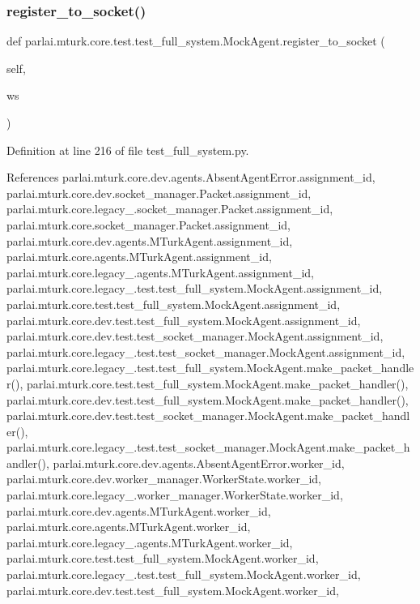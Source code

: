 \subsubsection{\texorpdfstring{register\+\_\+to\+\_\+socket()}{register\_to\_socket()}}
{\footnotesize\ttfamily def parlai.\+mturk.\+core.\+test.\+test\+\_\+full\+\_\+system.\+Mock\+Agent.\+register\+\_\+to\+\_\+socket (\begin{DoxyParamCaption}\item[{}]{self,  }\item[{}]{ws }\end{DoxyParamCaption})}



Definition at line 216 of file test\+\_\+full\+\_\+system.\+py.



References parlai.\+mturk.\+core.\+dev.\+agents.\+Absent\+Agent\+Error.\+assignment\+\_\+id, parlai.\+mturk.\+core.\+dev.\+socket\+\_\+manager.\+Packet.\+assignment\+\_\+id, parlai.\+mturk.\+core.\+legacy\+\_.\+socket\+\_\+manager.\+Packet.\+assignment\+\_\+id, parlai.\+mturk.\+core.\+socket\+\_\+manager.\+Packet.\+assignment\+\_\+id, parlai.\+mturk.\+core.\+dev.\+agents.\+M\+Turk\+Agent.\+assignment\+\_\+id, parlai.\+mturk.\+core.\+agents.\+M\+Turk\+Agent.\+assignment\+\_\+id, parlai.\+mturk.\+core.\+legacy\+\_.\+agents.\+M\+Turk\+Agent.\+assignment\+\_\+id, parlai.\+mturk.\+core.\+legacy\+\_.\+test.\+test\+\_\+full\+\_\+system.\+Mock\+Agent.\+assignment\+\_\+id, parlai.\+mturk.\+core.\+test.\+test\+\_\+full\+\_\+system.\+Mock\+Agent.\+assignment\+\_\+id, parlai.\+mturk.\+core.\+dev.\+test.\+test\+\_\+full\+\_\+system.\+Mock\+Agent.\+assignment\+\_\+id, parlai.\+mturk.\+core.\+dev.\+test.\+test\+\_\+socket\+\_\+manager.\+Mock\+Agent.\+assignment\+\_\+id, parlai.\+mturk.\+core.\+legacy\+\_.\+test.\+test\+\_\+socket\+\_\+manager.\+Mock\+Agent.\+assignment\+\_\+id, parlai.\+mturk.\+core.\+legacy\+\_.\+test.\+test\+\_\+full\+\_\+system.\+Mock\+Agent.\+make\+\_\+packet\+\_\+handler(), parlai.\+mturk.\+core.\+test.\+test\+\_\+full\+\_\+system.\+Mock\+Agent.\+make\+\_\+packet\+\_\+handler(), parlai.\+mturk.\+core.\+dev.\+test.\+test\+\_\+full\+\_\+system.\+Mock\+Agent.\+make\+\_\+packet\+\_\+handler(), parlai.\+mturk.\+core.\+dev.\+test.\+test\+\_\+socket\+\_\+manager.\+Mock\+Agent.\+make\+\_\+packet\+\_\+handler(), parlai.\+mturk.\+core.\+legacy\+\_.\+test.\+test\+\_\+socket\+\_\+manager.\+Mock\+Agent.\+make\+\_\+packet\+\_\+handler(), parlai.\+mturk.\+core.\+dev.\+agents.\+Absent\+Agent\+Error.\+worker\+\_\+id, parlai.\+mturk.\+core.\+dev.\+worker\+\_\+manager.\+Worker\+State.\+worker\+\_\+id, parlai.\+mturk.\+core.\+legacy\+\_.\+worker\+\_\+manager.\+Worker\+State.\+worker\+\_\+id, parlai.\+mturk.\+core.\+dev.\+agents.\+M\+Turk\+Agent.\+worker\+\_\+id, parlai.\+mturk.\+core.\+agents.\+M\+Turk\+Agent.\+worker\+\_\+id, parlai.\+mturk.\+core.\+legacy\+\_.\+agents.\+M\+Turk\+Agent.\+worker\+\_\+id, parlai.\+mturk.\+core.\+test.\+test\+\_\+full\+\_\+system.\+Mock\+Agent.\+worker\+\_\+id, parlai.\+mturk.\+core.\+legacy\+\_.\+test.\+test\+\_\+full\+\_\+system.\+Mock\+Agent.\+worker\+\_\+id, parlai.\+mturk.\+core.\+dev.\+test.\+test\+\_\+full\+\_\+system.\+Mock\+Agent.\+worker\+\_\+id, 